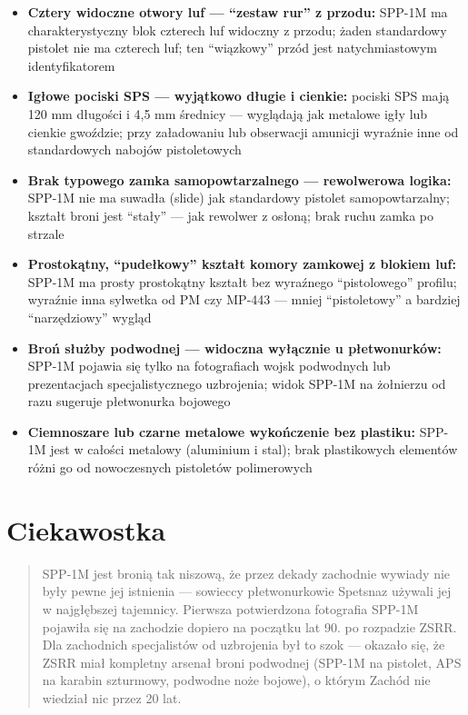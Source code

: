 \documentclass[12pt,openany,oneside]{book}
\providecommand{\tightlist}{%
  \setlength{\itemsep}{0pt}\setlength{\parskip}{0pt}}
\begin{document}
\begin{itemize}
\tightlist
\item
  \textbf{Cztery widoczne otwory luf --- ``zestaw rur'' z przodu:}
  SPP-1M ma charakterystyczny blok czterech luf widoczny z przodu; żaden
  standardowy pistolet nie ma czterech luf; ten ``wiązkowy'' przód jest
  natychmiastowym identyfikatorem
\item
  \textbf{Igłowe pociski SPS --- wyjątkowo długie i cienkie:} pociski
  SPS mają 120 mm długości i 4,5 mm średnicy --- wyglądają jak metalowe
  igły lub cienkie gwoździe; przy załadowaniu lub obserwacji amunicji
  wyraźnie inne od standardowych nabojów pistoletowych
\item
  \textbf{Brak typowego zamka samopowtarzalnego --- rewolwerowa logika:}
  SPP-1M nie ma suwadła (slide) jak standardowy pistolet
  samopowtarzalny; kształt broni jest ``stały'' --- jak rewolwer z
  osłoną; brak ruchu zamka po strzale
\item
  \textbf{Prostokątny, ``pudełkowy'' kształt komory zamkowej z blokiem
  luf:} SPP-1M ma prosty prostokątny kształt bez wyraźnego
  ``pistolowego'' profilu; wyraźnie inna sylwetka od PM czy MP-443 ---
  mniej ``pistoletowy'' a bardziej ``narzędziowy'' wygląd
\item
  \textbf{Broń służby podwodnej --- widoczna wyłącznie u płetwonurków:}
  SPP-1M pojawia się tylko na fotografiach wojsk podwodnych lub
  prezentacjach specjalistycznego uzbrojenia; widok SPP-1M na żołnierzu
  od razu sugeruje płetwonurka bojowego
\item
  \textbf{Ciemnoszare lub czarne metalowe wykończenie bez plastiku:}
  SPP-1M jest w całości metalowy (aluminium i stal); brak plastikowych
  elementów różni go od nowoczesnych pistoletów polimerowych
\end{itemize}

\section{Ciekawostka}\label{ciekawostka-99}

\begin{quote}
SPP-1M jest bronią tak niszową, że przez dekady zachodnie wywiady nie
były pewne jej istnienia --- sowieccy płetwonurkowie Spetsnaz używali
jej w najgłębszej tajemnicy. Pierwsza potwierdzona fotografia SPP-1M
pojawiła się na zachodzie dopiero na początku lat 90. po rozpadzie ZSRR.
Dla zachodnich specjalistów od uzbrojenia był to szok --- okazało się,
że ZSRR miał kompletny arsenał broni podwodnej (SPP-1M na pistolet, APS
na karabin szturmowy, podwodne noże bojowe), o którym Zachód nie
wiedział nic przez 20 lat.
\end{quote}
\end{document}
